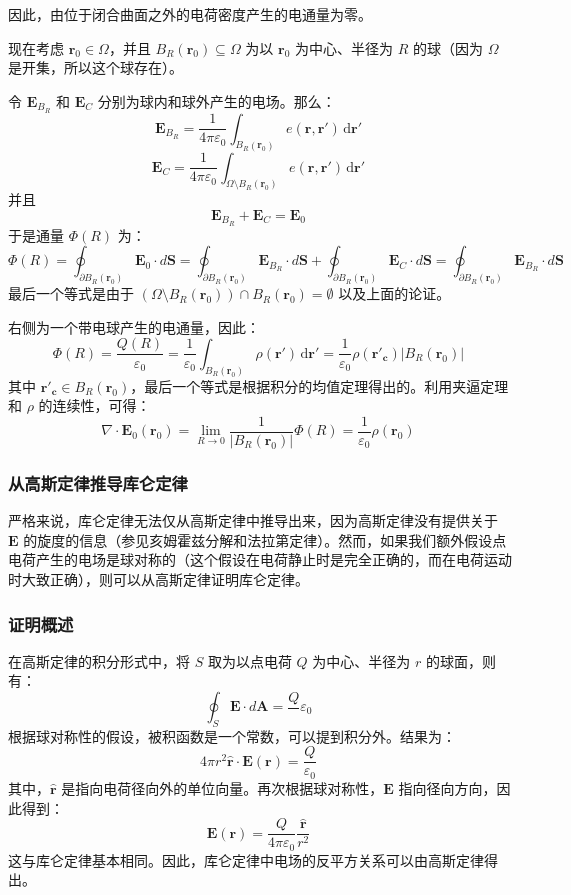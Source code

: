 因此，由位于闭合曲面之外的电荷密度产生的电通量为零。

现在考虑 \( \mathbf{r}_0 \in \Omega \)，并且 \( B_R(\mathbf{r}_0) \subseteq \Omega \) 为以 \( \mathbf{r}_0 \) 为中心、半径为 \( R \) 的球（因为 \(\Omega\) 是开集，所以这个球存在）。

令 \( \mathbf{E}_{B_R} \) 和 \( \mathbf{E}_C \) 分别为球内和球外产生的电场。那么：
\[
\mathbf{E}_{B_R} = \frac{1}{4 \pi \varepsilon_0} \int_{B_R(\mathbf{r}_0)} e(\mathbf{r}, \mathbf{r'}) \, \mathrm{d} \mathbf{r'}~
\]
\[
\mathbf{E}_C = \frac{1}{4 \pi \varepsilon_0} \int_{\Omega \setminus B_R(\mathbf{r}_0)} e(\mathbf{r}, \mathbf{r'}) \, \mathrm{d} \mathbf{r'}~
\]
并且
\[
\mathbf{E}_{B_R} + \mathbf{E}_C = \mathbf{E}_0~
\]
于是通量 \( \Phi(R) \) 为：
\[
\Phi(R) = \oint_{\partial B_R(\mathbf{r}_0)} \mathbf{E}_0 \cdot d\mathbf{S} = \oint_{\partial B_R(\mathbf{r}_0)} \mathbf{E}_{B_R} \cdot d\mathbf{S} + \oint_{\partial B_R(\mathbf{r}_0)} \mathbf{E}_C \cdot d\mathbf{S} = \oint_{\partial B_R(\mathbf{r}_0)} \mathbf{E}_{B_R} \cdot d\mathbf{S}~
\]
最后一个等式是由于 \((\Omega \setminus B_R(\mathbf{r}_0)) \cap B_R(\mathbf{r}_0) = \emptyset\) 以及上面的论证。

右侧为一个带电球产生的电通量，因此：
\[
\Phi(R) = \frac{Q(R)}{\varepsilon_0} = \frac{1}{\varepsilon_0} \int_{B_R(\mathbf{r}_0)} \rho(\mathbf{r'}) \, \mathrm{d} \mathbf{r'} = \frac{1}{\varepsilon_0} \rho(\mathbf{r'_c}) |B_R(\mathbf{r}_0)|~
\]
其中 \( \mathbf{r'_c} \in B_R(\mathbf{r}_0) \)，最后一个等式是根据积分的均值定理得出的。利用夹逼定理和 \(\rho\) 的连续性，可得：
\[
\nabla \cdot \mathbf{E}_0(\mathbf{r}_0) = \lim_{R \to 0} \frac{1}{|B_R(\mathbf{r}_0)|} \Phi(R) = \frac{1}{\varepsilon_0} \rho(\mathbf{r}_0)~
\]
\subsubsection{从高斯定律推导库仑定律}
严格来说，库仑定律无法仅从高斯定律中推导出来，因为高斯定律没有提供关于 \(\mathbf{E}\) 的旋度的信息（参见亥姆霍兹分解和法拉第定律）。然而，如果我们额外假设点电荷产生的电场是球对称的（这个假设在电荷静止时是完全正确的，而在电荷运动时大致正确），则可以从高斯定律证明库仑定律。

\subsubsection{证明概述}
在高斯定律的积分形式中，将 \( S \) 取为以点电荷 \( Q \) 为中心、半径为 \( r \) 的球面，则有：
\[
\oint_{S} \mathbf{E} \cdot d\mathbf{A} = \frac{Q}~{\varepsilon_0}~
\]
根据球对称性的假设，被积函数是一个常数，可以提到积分外。结果为：
\[
4 \pi r^2 \hat{\mathbf{r}} \cdot \mathbf{E}(\mathbf{r}) = \frac{Q}{\varepsilon_0}~
\]
其中，\(\hat{\mathbf{r}}\) 是指向电荷径向外的单位向量。再次根据球对称性，\(\mathbf{E}\) 指向径向方向，因此得到：
\[
\mathbf{E}(\mathbf{r}) = \frac{Q}{4 \pi \varepsilon_0} \frac{\hat{\mathbf{r}}}{r^2}~
\]
这与库仑定律基本相同。因此，库仑定律中电场的反平方关系可以由高斯定律得出。
